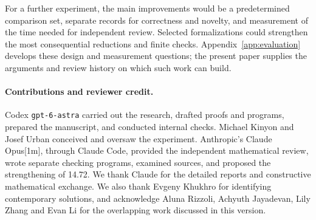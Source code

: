 For a further experiment, the main improvements would be a predetermined
comparison set, separate records for correctness and novelty, and
measurement of the time needed for independent review. Selected
formalizations could strengthen the most consequential reductions and
finite checks. Appendix~\ref{app:evaluation} develops these design and
measurement questions; the present paper supplies the arguments and
review history on which such work can build.

\paragraph{Contributions and reviewer credit.}
Codex \texttt{gpt-6-astra} carried out the research, drafted proofs and
programs, prepared the manuscript, and conducted internal checks.
Michael Kinyon and Josef Urban conceived and oversaw the experiment.
Anthropic's Claude Opus[1m], through Claude Code, provided the independent
mathematical review, wrote separate checking programs, examined sources,
and proposed the strengthening of 14.72. We thank Claude for the detailed
reports and constructive mathematical exchange.
We also thank Evgeny Khukhro for identifying contemporary solutions,
and acknowledge Aluna Rizzoli, Achyuth Jayadevan, Lily Zhang and Evan Li
for the overlapping work discussed in this version.
